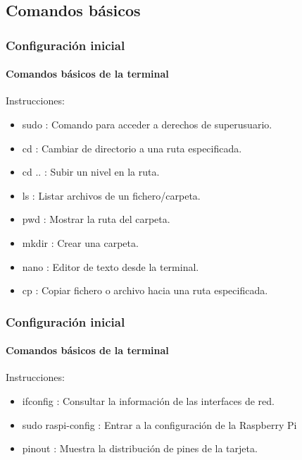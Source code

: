 \documentclass{beamer}
\begin{document}
	\subsection{Comandos básicos}
	\begin{frame}
		\frametitle{Configuración inicial}
		\framesubtitle{Comandos básicos de la terminal}
		\begin{mybox}{Instrucciones:}
			\begin{itemize}
				\item sudo :  Comando para acceder a derechos de superusuario.
				\item cd  : Cambiar de directorio a una ruta especificada.
				\item cd .. : Subir un nivel en la ruta.
				\item ls  : Listar archivos de un fichero/carpeta.
				\item pwd : Mostrar la ruta del carpeta.
				\item mkdir : Crear una carpeta.
				\item nano : Editor de texto desde la terminal.
				\item cp   : Copiar fichero o archivo hacia una ruta especificada.
				
				
			\end{itemize}
		\end{mybox}
		
	\end{frame}
	
	\begin{frame}
		\frametitle{Configuración inicial}
		\framesubtitle{Comandos básicos de la terminal}
		\begin{mybox}{Instrucciones:}
			\begin{itemize}
				\item ifconfig : Consultar la información de las interfaces de red.
				\item sudo raspi-config : Entrar a la configuración de la Raspberry Pi
				\item pinout : Muestra la distribución de pines de la tarjeta.
			\end{itemize}
		\end{mybox}
		
		
	\end{frame}
\end{document}

